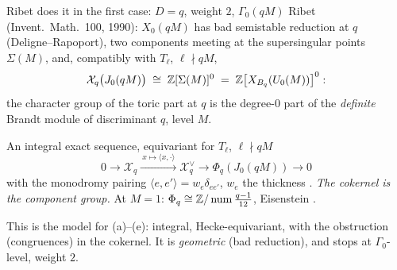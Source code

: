 \begin{frame}{Ribet does it in the first case: $D=q$, weight $2$, $\Gamma_0(qM)$}
  \small
  Ribet (Invent.\ Math.\ 100, 1990): $X_0(qM)$ has bad semistable reduction at $q$ (Deligne--Rapoport),
  two components meeting at the supersingular points $\Sigma(M)$, and, compatibly with $T_\ell$, $\ell\nmid qM$,
  \[\mathcal X_q\big(J_0(qM)\big)\;\cong\;\mathbb{Z}[\Sigma(M)]^0\;=\;\mathbb{Z}\big[X_{B_q}(U_0(M))\big]^0 :\]
  the character group of the toric part at $q$ is the degree-$0$ part of the \emph{definite} Brandt module of discriminant $q$, level $M$.
  \begin{block}{An integral exact sequence, equivariant for $T_\ell$, $\ell\nmid qM$}
    \[0\to\mathcal X_q\xrightarrow{\ x\mapsto\langle x,\cdot\rangle\ }\mathcal X_q^\vee\to\Phi_q(J_0(qM))\to0\]
    with the monodromy pairing $\langle e,e'\rangle=w_e\delta_{ee'}$, $w_e$ the thickness .
    \emph{The cokernel is the component group.} At $M=1$: $\Phi_q\cong\mathbb{Z}/\operatorname{num}\frac{q-1}{12}$, Eisenstein .
  \end{block}
  This is the model for (a)--(e): integral, Hecke-equivariant, with the obstruction (congruences) in the cokernel.
  It is \emph{geometric} (bad reduction), and stops at $\Gamma_0$-level, weight $2$.
\end{frame}
